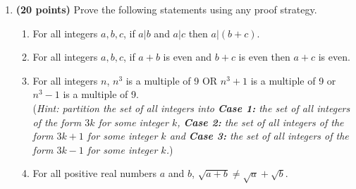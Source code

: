 \documentclass[10pt,letterpaper,unboxed,cm]{article}
\begin{document}
\begin{enumerate}
\item {\bf (20 points)}
Prove the following statements using any proof strategy.
\begin{enumerate}
\item
For all integers $a,b,c$, if $a|b$ and $a|c$ then $a|(b+c)$.
\item
For all integers $a,b,c$, if $a+b$ is even and $b+c$ is even then $a+c$ is even.
\item
For all integers $n$, $n^3$ is a multiple of 9 OR $n^3+1$ is a multiple of 9 or $n^3-1$ is a multiple of 9.\\
(\emph{Hint: partition the set of all integers into {\bf Case 1:} the set of all integers of the form $3k$ for some integer $k$, {\bf Case 2:} the set of all integers of the form $3k+1$ for some integer $k$ and {\bf Case 3:} the set of all integers of the form $3k-1$ for some integer $k$.})
\item
For all positive real numbers $a$ and $b$, $\sqrt{a+b}\neq \sqrt{a} + \sqrt{b}$.


\end{enumerate}
\end{enumerate}
\end{document}
